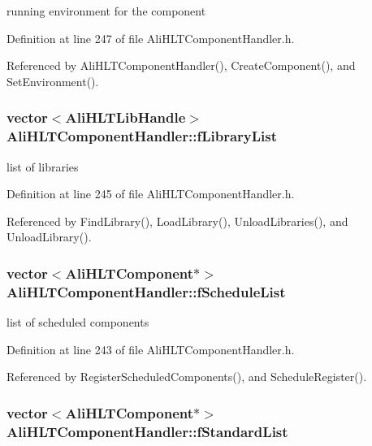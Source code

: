 running environment for the component 

Definition at line 247 of file Ali\-HLTComponent\-Handler.h.

Referenced by Ali\-HLTComponent\-Handler(), Create\-Component(), and Set\-Environment().
\subsubsection{\setlength{\rightskip}{0pt plus 5cm}vector$<${\bf Ali\-HLTLib\-Handle}$>$ {\bf Ali\-HLTComponent\-Handler::f\-Library\-List}\hspace{0.3cm}{\tt  [private]}}\label{classAliHLTComponentHandler_r2}


list of libraries 

Definition at line 245 of file Ali\-HLTComponent\-Handler.h.

Referenced by Find\-Library(), Load\-Library(), Unload\-Libraries(), and Unload\-Library().
\subsubsection{\setlength{\rightskip}{0pt plus 5cm}vector$<${\bf Ali\-HLTComponent}$\ast$$>$ {\bf Ali\-HLTComponent\-Handler::f\-Schedule\-List}\hspace{0.3cm}{\tt  [private]}}\label{classAliHLTComponentHandler_r1}


list of scheduled components 

Definition at line 243 of file Ali\-HLTComponent\-Handler.h.

Referenced by Register\-Scheduled\-Components(), and Schedule\-Register().
\subsubsection{\setlength{\rightskip}{0pt plus 5cm}vector$<${\bf Ali\-HLTComponent}$\ast$$>$ {\bf Ali\-HLTComponent\-Handler::f\-Standard\-List}\hspace{0.3cm}{\tt  [private]}}\label{classAliHLTComponentHandler_r4}


